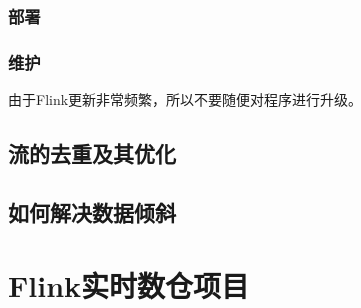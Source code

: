 \documentclass[cn,11pt,chinese]{elegantbook}
\begin{document}
\section{部署}

\section{维护}

由于Flink更新非常频繁，所以不要随便对程序进行升级。

\chapter{流的去重及其优化}

\chapter{如何解决数据倾斜}

\part{Flink实时数仓项目}
\end{document}
